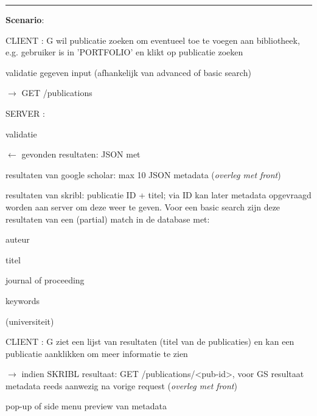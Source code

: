 \documentclass{article}
\begin{document}
    


\clearpage

\hrule
\vspace{2 mm}
\noindent \textbf{Scenario}:
\begin{description}
\item CLIENT : G wil publicatie zoeken om eventueel toe te voegen aan bibliotheek, e.g. gebruiker is in 'PORTFOLIO' en klikt op publicatie zoeken  
	\begin{description}
	\item \checkmark validatie gegeven input (afhankelijk van advanced of basic search)
	\item $\rightarrow$ GET /publications 
	\end{description}
	
\item SERVER : 
	\begin{description}
	\item \checkmark validatie
	\item $\leftarrow$ gevonden resultaten: JSON met
		\begin{description}
		\item resultaten van google scholar: max 10 JSON metadata (\emph{overleg met front})
		\item resultaten van skribl: publicatie ID + titel; via ID kan later metadata opgevraagd worden aan server om deze weer te geven. Voor een basic search zijn deze resultaten van een (partial) match in de database met:
			\begin{description}
			\item auteur
			\item titel
			\item journal of proceeding
			\item keywords
			\item (universiteit)
			\end{description}
		\end{description}
	\end{description}
	
\item CLIENT :  G ziet een lijst van resultaten (titel van de publicaties) en kan een publicatie aanklikken om meer informatie te zien 
	\begin{description}
	\item $\rightarrow$ indien SKRIBL resultaat: GET /publications/<pub-id>, voor GS resultaat metadata reeds aanwezig na vorige request (\emph{overleg met front})
	\item pop-up of side menu preview van metadata 
	\end{description}
	

\end{description}
\end{document}
